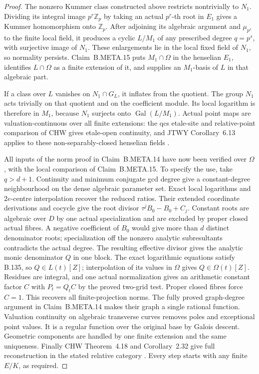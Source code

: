 \begin{proof}
The nonzero Kummer class constructed above
restricts nontrivially to $N_1$.
Dividing its integral image $p^r\mathbb Z_p$
by taking an actual $p^r$-th root in $E_1$
gives a Kummer homomorphism onto $\mathbb Z_p$.
After adjoining its algebraic argument and
$\mu_{p^s}$ to the finite local field, it
produces a cyclic $L/M_1$ of any prescribed
degree $q=p^s$, with surjective image of $N_1$.
These enlargements lie in the local fixed
field of $N_1$, so normality persists.
Claim~B.META.15 puts $M_1\cap\Omega$ in
the henselian $E_1$, identifies
$L\cap\Omega$ as a finite extension of it,
and supplies an $M_1$-basis of $L$ in that
algebraic part.

If a class over $L$ vanishes on
$N_1\cap G_L$, it inflates from the quotient.
The group $N_1$ acts trivially on that quotient
and on the coefficient module.
Its local logarithm is therefore in $M_1$,
because $N_1$ surjects onto $\operatorname{Gal}(L/M_1)$.
Actual point maps are valuation-continuous
over all finite extensions: the qcs etale-site
and relative-point comparison of CHW gives
etale-open continuity, and JTWY Corollary~6.13
applies to these non-separably-closed henselian
fields \citep{AN_CHW2024,AN_JTWY2024}.

All inputs of the norm proof in
Claim~B.META.14 have now been verified over
$\Omega$, with the local comparison of
Claim~B.META.15.
To specify the use, take $q>d+1$.
Continuity and minimum conjugate gcd degree
give a constant-degree neighbourhood on the
dense algebraic parameter set.
Exact local logarithms and $2e$-centre
interpolation recover the reduced ratios.
Their extended coordinate derivations and
cocycle give the root divisor
$\tau^jB_0-B_0+C_j$.
Constant roots are algebraic over $D$ by
one actual specialization and are excluded
by proper closed actual fibres.
A negative coefficient of $B_0$ would give
more than $d$ distinct denominator roots;
specialization off the nonzero analytic
subresultants contradicts the actual degree.
The resulting effective divisor gives the
analytic monic denominator $Q$ in one block.
The exact logarithmic equations satisfy
B.135, so $Q\in L(t)[Z]$; interpolation of
its values in $\Omega$ gives $Q\in\Omega(t)[Z]$.
Residues are integral, and one actual
normalization gives an arithmetic constant
factor $C$ with $P_t=Q_tC$ by the proved
two-grid test.
Proper closed fibres force $C=1$.
This recovers all finite-projection norms.
The fully proved graph-degree argument in
Claim~B.META.14 makes their graph a single
rational function.  Valuation continuity
on algebraic transverse curves removes
poles and exceptional point values.
It is a regular function over the original
base by Galois descent.
Geometric components are handled by one
finite extension and the same uniqueness.
Finally CHW Theorem~4.18 and Corollary~2.32
give full reconstruction in the stated
relative category \citep{AN_CHW2024}.
Every step starts with any finite $E/K$,
as required.
\end{proof}

